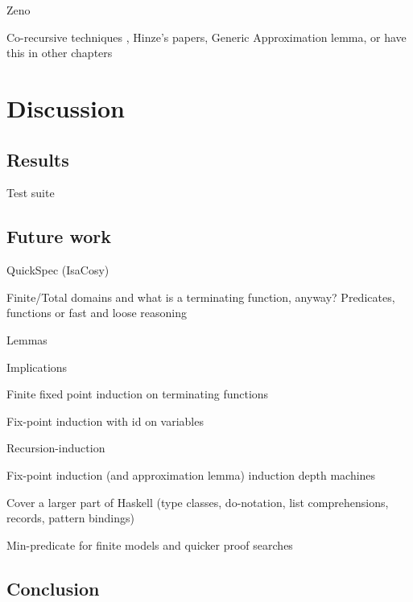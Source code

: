 \documentclass{report}
\begin{document}
Zeno

Co-recursive techniques \cite{corecursive}, Hinze's papers, Generic
Approximation lemma, or have this in other chapters







\chapter{Discussion}

\section{Results}

Test suite

\section{Future work}

QuickSpec (IsaCosy)

Finite/Total domains and what is a terminating function, anyway?
Predicates, functions or fast and loose reasoning \cite{fastandloose}

Lemmas

Implications

Finite fixed point induction on terminating functions

Fix-point induction with id on variables

Recursion-induction

Fix-point induction (and approximation lemma) induction depth machines

Cover a larger part of Haskell (type classes, do-notation, list
comprehensions, records, pattern bindings)

Min-predicate for finite models and quicker proof searches

\section{Conclusion}




\end{document}

